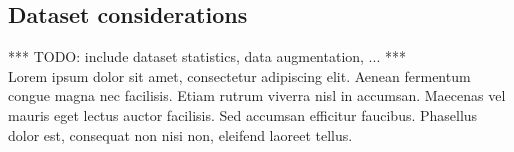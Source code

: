     \subsection{Dataset considerations}
        \par{
            *** TODO: include dataset statistics, data augmentation, ... ***\\
            Lorem ipsum dolor sit amet, consectetur adipiscing elit. Aenean fermentum congue magna nec facilisis. Etiam rutrum viverra nisl in accumsan. Maecenas vel mauris eget lectus auctor facilisis. Sed accumsan efficitur faucibus. Phasellus dolor est, consequat non nisi non, eleifend laoreet tellus.
        }